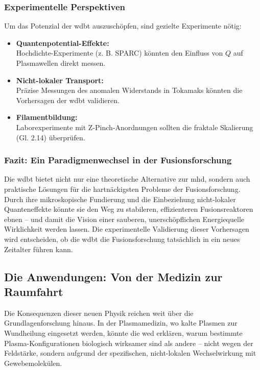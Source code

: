 \subsubsection{Experimentelle Perspektiven}
Um das Potenzial der \gls{wdbt} auszuschöpfen, sind gezielte Experimente nötig:

\begin{itemize}
    \item \textbf{Quantenpotential-Effekte:}\\Hochdichte-Experimente (z. B. SPARC) könnten den Einfluss von $Q$ auf Plasmawellen direkt messen.
    \item \textbf{Nicht-lokaler Transport:}\\Präzise Messungen des anomalen Widerstands in Tokamaks könnten die Vorhersagen der \gls{wdbt} validieren.
    \item \textbf{Filamentbildung:}\\Laborexperimente mit Z-Pinch-Anordnungen sollten die fraktale Skalierung (Gl. 2.14) überprüfen.
\end{itemize}

\subsubsection{Fazit: Ein Paradigmenwechsel in der Fusionsforschung}
Die \gls{wdbt} bietet nicht nur eine theoretische Alternative zur \gls{mhd}, sondern auch praktische Lösungen für die hartnäckigsten Probleme der Fusionsforschung. Durch ihre mikroskopische Fundierung
und die Einbeziehung nicht-lokaler Quanteneffekte könnte sie den Weg zu stabileren, effizienteren Fusionsreaktoren ebnen – und damit die Vision einer sauberen, unerschöpflichen Energiequelle
Wirklichkeit werden lassen. Die experimentelle Validierung dieser Vorhersagen wird entscheiden, ob die \gls{wdbt} die Fusionsforschung tatsächlich in ein neues Zeitalter führen kann.

\subsection{Die Anwendungen: Von der Medizin zur Raumfahrt}
Die Konsequenzen dieser neuen Physik reichen weit über die Grundlagenforschung hinaus. In der Plasmamedizin, wo kalte Plasmen zur Wundheilung eingesetzt werden, könnte die
\gls{wed} erklären, warum bestimmte Plasma-Konfigurationen biologisch wirksamer sind als andere – nicht wegen der Feldstärke, sondern aufgrund der spezifischen,
nicht-lokalen Wechselwirkung mit Gewebemolekülen.

